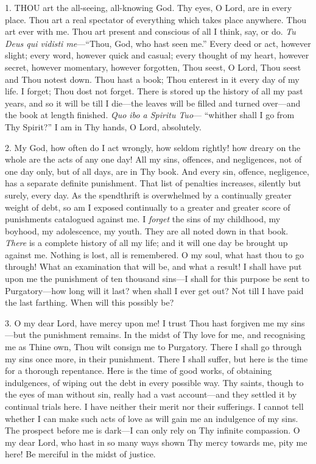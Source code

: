 
1. THOU
art the all-seeing, all-knowing God. Thy eyes, O Lord, are in every
place. Thou art a real spectator of everything which takes place
anywhere. Thou art ever with me. Thou art present and conscious of all I
think, say, or do. \emph{Tu Deus qui vidisti me}—``Thou, God, who hast
seen me.'' Every deed or act, however slight; every word, however quick
and casual; every thought of my heart, however secret, however
momentary, however forgotten, Thou seest, O Lord, Thou seest and Thou
notest down. Thou hast a book; Thou enterest in it every day of my life.
I forget; Thou dost not forget. There is stored up the history of all my
past years, and so it will be till I die—the leaves will be filled and
turned over—and the book at length finished. \emph{Quo ibo a Spiritu Tuo}—
``whither shall I go from Thy Spirit?'' I am in Thy hands, O Lord,
absolutely.

2. My God, how often do I act
wrongly, how seldom rightly! how dreary on the whole are the acts of any
one day! All my sins, offences, and negligences, not of one day only,
but of all days, are in Thy book. And every sin, offence, negligence,
has a separate definite punishment. That list of penalties increases,
silently but surely, every day. As the spendthrift is overwhelmed by a
continually greater weight of debt, so am I exposed continually to a
greater and greater score of punishments catalogued against me. I \emph{forget}
the sins of my childhood, my boyhood, my adolescence, my youth. They are
all noted down in that book. \emph{There} is a complete history of all
my life; and it will one day be brought up against me. Nothing is lost,
all is remembered. O my soul, what hast thou to go through! What an
examination that will be, and what a result! I shall have put upon me
the punishment of ten thousand sins—I shall for this purpose be sent
to Purgatory—how long will it last? when shall I ever get out? Not
till I have paid the last farthing. When will this possibly be?

3. O my dear Lord, have mercy
upon me! I trust Thou hast forgiven me my sins—but the punishment
remains. In the midst of Thy love for me, and recognising me as Thine
own, Thou wilt consign me to Purgatory. There I shall go through my sins
once more, in their punishment. There I shall suffer, but here is the
time for a thorough repentance. Here is the time of good works, of
obtaining indulgences, of wiping out the debt in every possible way. Thy
saints, though to the eyes of man without sin, really had a vast
account—and they settled it by continual trials here. I have neither
their merit nor their sufferings. I cannot tell whether I can make such
acts of love as will gain me an indulgence of my sins. The prospect
before me is dark—I can only rely on Thy infinite compassion. O my
dear Lord, who hast in so many ways shown Thy mercy towards me, pity me
here! Be merciful in the midst of justice.

